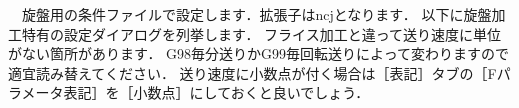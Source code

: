 

\vspace*{1zh}
　旋盤用の条件ファイルで設定します．拡張子はncjとなります．
以下に旋盤加工特有の設定ダイアログを列挙します．
フライス加工と違って送り速度に単位がない箇所があります．
G98毎分送りかG99毎回転送りによって変わりますので適宜読み替えてください．
送り速度に小数点が付く場合は［表記］タブの［Fパラメータ表記］を［小数点］にしておくと良いでしょう．




